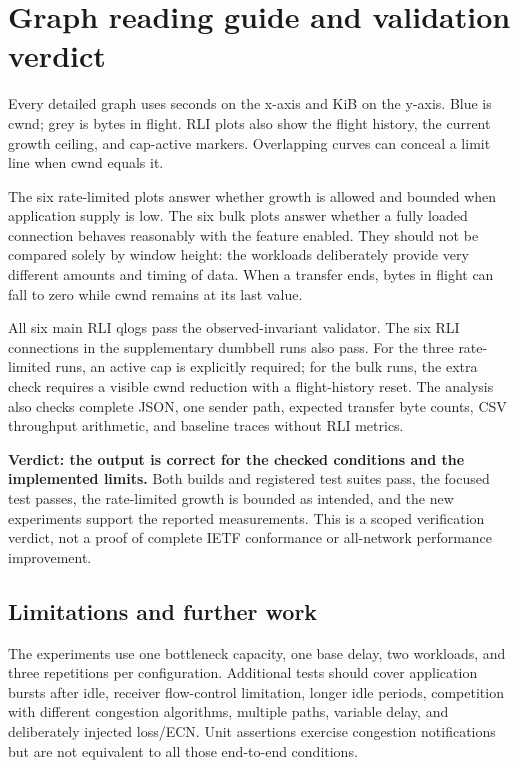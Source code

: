\documentclass[11pt,a4paper]{article}
\begin{document}
\section{Graph reading guide and validation verdict}
Every detailed graph uses seconds on the x-axis and KiB on the y-axis.
Blue is cwnd; grey is bytes in flight. RLI plots also show the flight
history, the current growth ceiling, and cap-active markers. Overlapping
curves can conceal a limit line when cwnd equals it.

The six rate-limited plots answer whether growth is allowed and bounded
when application supply is low. The six bulk plots answer whether a
fully loaded connection behaves reasonably with the feature enabled.
They should not be compared solely by window height: the workloads
deliberately provide very different amounts and timing of data. When a
transfer ends, bytes in flight can fall to zero while cwnd remains at its
last value.

All six main RLI qlogs pass the observed-invariant validator. The six
RLI connections in the supplementary dumbbell runs also pass. For the three
rate-limited runs, an active cap is explicitly required; for the bulk
runs, the extra check requires a visible cwnd reduction with a flight-history
reset. The analysis also checks complete JSON, one sender path, expected
transfer byte counts, CSV throughput arithmetic, and baseline traces
without RLI metrics.

\textbf{Verdict: the output is correct for the checked conditions and the
implemented limits.} Both builds and registered test suites pass, the
focused test passes, the rate-limited growth is bounded as intended,
and the new experiments support the reported measurements. This is a
scoped verification verdict, not a proof of complete IETF conformance or
all-network performance improvement.

\subsection{Limitations and further work}
The experiments use one bottleneck capacity, one base delay, two workloads,
and three repetitions per configuration. Additional tests should cover
application bursts after idle, receiver flow-control limitation, longer
idle periods, competition with different congestion algorithms, multiple paths, variable delay,
and deliberately injected loss/ECN. Unit assertions exercise congestion
notifications but are not equivalent to all those end-to-end conditions.
\end{document}
